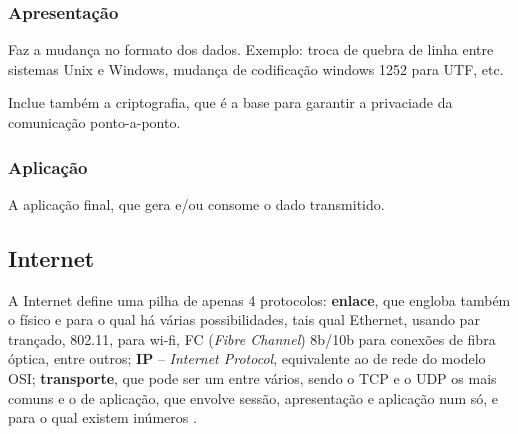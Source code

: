 \subsubsection{Apresentação}
Faz a mudança no formato dos dados. Exemplo: troca de quebra de linha entre sistemas Unix e Windows, mudança de codificação windows 1252 para UTF, etc.

Inclue também a criptografia, que é a base para garantir a privaciade da comunicação ponto-a-ponto.

\subsubsection{Aplicação}
A aplicação final, que gera e/ou consome o dado transmitido.

\subsection{Internet}
	A Internet define uma pilha de apenas 4 protocolos: \textbf{enlace}, que engloba também o físico e para o qual há várias possibilidades, tais qual Ethernet, usando par trançado, 802.11, para wi-fi, FC (\emph{Fibre Channel}) 8b/10b para conexões de fibra óptica, entre outros; \textbf{IP} -- \emph{Internet Protocol}, equivalente ao de rede do modelo OSI; \textbf{transporte}, que pode ser um entre vários, sendo o TCP e o UDP os mais comuns e o de aplicação, que envolve sessão, apresentação e aplicação num só, e para o qual existem inúmeros
	.

